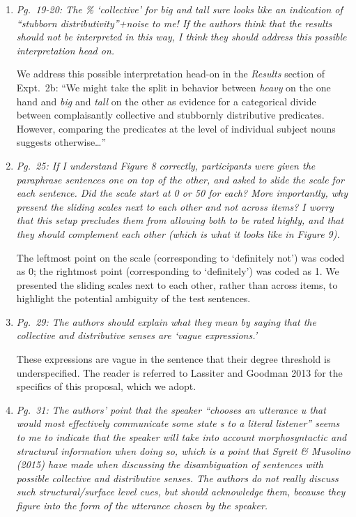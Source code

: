 \documentclass[12pt]{article}
\begin{document}
\begin{enumerate}
\item \emph{Pg.~19-20: The \% `collective' for \emph{big} and \emph{tall} sure looks like an indication of ``stubborn distributivity''+noise to me! If the authors think that the results should not be interpreted in this way, I think they should address this possible interpretation head on.}

We address this possible interpretation head-on in the \emph{Results} section of Expt.~2b: ``We might take the split in behavior between \emph{heavy} on the one hand and \emph{big} and \emph{tall} on the other as evidence for a categorical divide between complaisantly collective and stubbornly distributive predicates. However, comparing the predicates at the level of individual subject nouns suggests otherwise\ldots''

\item \emph{Pg.~25: If I understand Figure 8 correctly, participants were given the paraphrase sentences one on top of the other, and asked to slide the scale for each sentence. Did the scale start at 0 or 50 for each? More importantly, why present the sliding scales next to each other and not across items? I worry that this setup precludes them from allowing both to be rated highly, and that they should complement each other (which is what it looks like in Figure 9).}

The leftmost point on the scale (corresponding to `definitely not') was coded as 0; the rightmost point (corresponding to `definitely') was coded as 1. We presented the sliding scales next to each other, rather than across items, to highlight the potential ambiguity of the test sentences.

\item \emph{Pg.~29: The authors should explain what they mean by saying that the collective and distributive senses are `vague expressions.'}

These expressions are vague in the sentence that their degree threshold is underspecified. The reader is referred to Lassiter and Goodman 2013 for the specifics of this proposal, which we adopt.

\item \emph{Pg.~31: The authors' point that the speaker ``chooses an utterance u that would most effectively communicate some state s to a literal listener'' seems to me to indicate that the speaker will take
into account morphosyntactic and structural information when doing so, which is a point that Syrett \& Musolino (2015) have made when discussing the disambiguation of sentences with possible collective and distributive senses. The authors do not really discuss such structural/surface level cues, but should acknowledge them, because they figure into the form of the utterance chosen by the speaker.}


\end{enumerate}
\end{document}
